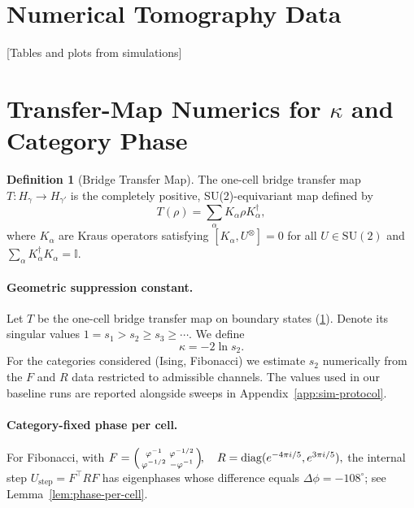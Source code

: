\documentclass[11pt]{article}
\theoremstyle{plain}
\theoremstyle{definition}
\newtheorem{definition}[theorem]{Definition}
\begin{document}
\section{Numerical Tomography Data}
[Tables and plots from simulations]

\section{Transfer-Map Numerics for $\kappa$ and Category Phase}\label{app:transfer-numerics}

\begin{definition}[Bridge Transfer Map]\label{def:transfer-map}
  The one-cell bridge transfer map $T: H_\gamma \to H_{\gamma'}$ is the completely positive, SU(2)-equivariant map defined by
  \[
    T(\rho) = \sum_{\alpha} K_\alpha \rho K_\alpha^\dagger,
  \]
  where $K_\alpha$ are Kraus operators satisfying $[K_\alpha, U^{\otimes}] = 0$ for all $U \in \mathrm{SU}(2)$ and $\sum_\alpha K_\alpha^\dagger K_\alpha = \mathbb{I}$.
\end{definition}

\paragraph{Geometric suppression constant.}
Let $T$ be the one-cell bridge transfer map on boundary states (\ref{def:transfer-map}). Denote its singular values $1=s_1>s_2\ge s_3\ge\cdots$. We define
\begin{equation}
  \kappa = -2\ln s_2.
\end{equation}
For the categories considered (Ising, Fibonacci) we estimate $s_2$ numerically from the $F$ and $R$ data restricted to admissible channels. The values used in our baseline runs are reported alongside sweeps in Appendix~\ref{app:sim-protocol}.

\paragraph{Category-fixed phase per cell.}
For Fibonacci, with
\(
  F=
  \begin{psmallmatrix}
    \varphi^{-1} & \varphi^{-1/2}\\
    \varphi^{-1/2} & -\varphi^{-1}
  \end{psmallmatrix}\!,
  \quad
  R=\mathrm{diag}(e^{-4\pi i/5}, e^{3\pi i/5}),
\)
the internal step $U_{\mathrm{step}}=F^\top R F$ has eigenphases whose difference equals $\Delta\phi=-108^\circ$; see Lemma~\ref{lem:phase-per-cell}.
\end{document}

